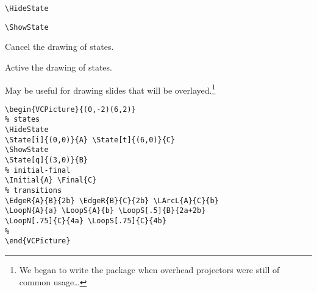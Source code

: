 \documentclass[11pt,twoside]{article}
\newlength{\ColoText}%
\newlength{\ColoFigu}%
\newlength{\parindenttemp} %
\newcommand{\noi}{\noindent}
\newcommand{\ee}{\text{\qquad}}               %
\newlength{\jsIndent}%
\newlength{\ColSource}%
\newlength{\ColFigur}%
\begin{document}
\noi 
\hspace*{-\jsIndent}
\begin{minipage}[t]{\ColoText}
        \par\vspace*{0mm}%
        \footnotesize
\verb+\HideState+ \ee 
   
\medskip 
\verb+\ShowState+ \ee 
   
\end{minipage}%
\hspace*{1.2em}%
\begin{minipage}[t]{\ColoFigu}%
\par\vspace*{0mm}%
Cancel the drawing of states.

\smallskip 

Active the drawing of states.
\end{minipage}%

\medskip
\noi 
May be useful for drawing slides that will be overlayed.\footnote{%
   We began to write the package when overhead projectors were still 
   of common usage\ldots}

\noi 
\hspace*{-\jsIndent}
\begin{minipage}[c]{\ColFigur}%
\par\vspace*{0mm}%
\begin{center}
%
\end{center}
\end{minipage}%
\hspace*{1.2em}%
\begin{minipage}[c]{\ColSource}
\setlength{\parindent}{\parindenttemp}%
\par\vspace*{0mm}%
\footnotesize
\begin{verbatim}
\begin{VCPicture}{(0,-2)(6,2)}
% states
\HideState
\State[i]{(0,0)}{A} \State[t]{(6,0)}{C}
\ShowState
\State[q]{(3,0)}{B} 
% initial-final
\Initial{A} \Final{C}
% transitions 
\EdgeR{A}{B}{2b} \EdgeR{B}{C}{2b} \LArcL{A}{C}{b}
\LoopN{A}{a} \LoopS{A}{b} \LoopS[.5]{B}{2a+2b} 
\LoopN[.75]{C}{4a} \LoopS[.75]{C}{4b}
%
\end{VCPicture}
\end{verbatim}
\normalsize
\end{minipage}%
\end{document}
